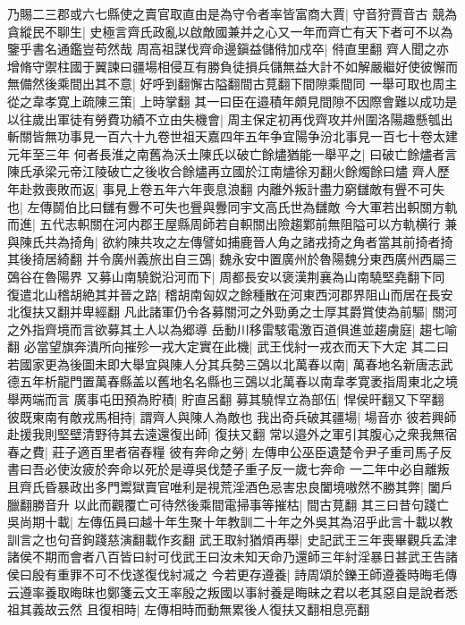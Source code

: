 乃賜二三郡或六七縣使之賣官取直由是為守令者率皆富商大賈|{
	守音狩賈音古}
競為貪縱民不聊生|{
	史極言齊氏政亂以啟敵國兼并之心又一年而齊亡有天下者可不以為鑒乎書名通鑑豈苟然哉}
周高祖謀伐齊命邊鎭益儲偫加戍卒|{
	偫直里翻}
齊人聞之亦增脩守禦柱國于翼諫曰疆場相侵互有勝負徒損兵儲無益大計不如解嚴繼好使彼懈而無備然後乘間出其不意|{
	好呼到翻懈古隘翻間古莧翻下間隙乘間同}
一舉可取也周主從之韋孝寛上疏陳三策|{
	上時掌翻}
其一曰臣在邉積年頗見間隙不因際會難以成功是以往歲出軍徒有勞費功績不立由失機會|{
	周主保定初再伐齊攻并州圍洛陽趣懸瓠出斬關皆無功事見一百六十九卷世祖天嘉四年五年争宜陽争汾北事見一百七十卷太建元年至三年}
何者長淮之南舊為沃土陳氏以破亡餘燼猶能一舉平之|{
	曰破亡餘燼者言陳氏承梁元帝江陵破亡之後收合餘燼再立國於江南燼徐刃翻火餘燭餘曰燼}
齊人歷年赴救喪敗而返|{
	事見上卷五年六年喪息浪翻}
内離外叛計盡力窮讎敵有舋不可失也|{
	左傳鬬伯比曰讎有釁不可失也舋與釁同宇文高氏世為讎敵}
今大軍若出軹關方軌而進|{
	五代志軹關在河内郡王屋縣周師若自軹關出險趨鄴前無阻隘可以方軌横行}
兼與陳氏共為掎角|{
	欲約陳共攻之左傳譬如捕鹿晉人角之諸戎掎之角者當其前掎者掎其後掎居綺翻}
并令廣州義旅出自三鵶|{
	魏永安中置廣州於魯陽魏分東西廣州西屬三鵶谷在魯陽界}
又募山南驍鋭沿河而下|{
	周都長安以褒漢荆襄為山南驍堅堯翻下同}
復遣北山稽胡絶其并晉之路|{
	稽胡南匈奴之餘種散在河東西河郡界阻山而居在長安北復扶又翻并卑經翻}
凡此諸軍仍令各募關河之外勁勇之士厚其爵賞使為前驅|{
	關河之外指齊境而言欲募其土人以為郷導}
岳動川移雷駭電激百道俱進並趨虜庭|{
	趨七喻翻}
必當望旗奔潰所向摧殄一戎大定實在此機|{
	武王伐紂一戎衣而天下大定}
其二曰若國家更為後圖未即大舉宜與陳人分其兵勢三鵶以北萬春以南|{
	萬春地名新唐志武德五年析龍門置萬春縣盖以舊地名名縣也三鵶以北萬春以南韋孝寛袤指周東北之境舉两端而言}
廣事屯田預為貯積|{
	貯直呂翻}
募其驍悍立為部伍|{
	悍侯旰翻又下罕翻}
彼既東南有敵戎馬相持|{
	謂齊人與陳人為敵也}
我出奇兵破其疆場|{
	場音亦}
彼若興師赴援我則堅壁清野待其去遠還復出師|{
	復扶又翻}
常以邉外之軍引其腹心之衆我無宿春之費|{
	莊子適百里者宿舂糧}
彼有奔命之勞|{
	左傳申公巫臣遺楚令尹子重司馬子反書曰吾必使汝疲於奔命以死於是導吳伐楚子重子反一歲七奔命}
一二年中必自離叛且齊氏昏暴政出多門鬻獄賣官唯利是視荒淫酒色忌害忠良闔境嗷然不勝其弊|{
	闔戶臘翻勝音升}
以此而觀覆亡可待然後乘間電掃事等摧枯|{
	間古莧翻}
其三曰昔句踐亡吳尚期十載|{
	左傳伍員曰越十年生聚十年教訓二十年之外吳其為沼乎此言十載以教訓言之也句音鉤踐慈演翻載作亥翻}
武王取紂猶煩再舉|{
	史記武王三年喪畢觀兵孟津諸侯不期而會者八百皆曰紂可伐武王曰汝未知天命乃還師三年紂淫暴日甚武王告諸侯曰殷有重罪不可不伐遂復伐紂㓕之}
今若更存遵養|{
	詩周頌於鑠王師遵養時晦毛傳云遵率養取晦昩也鄭箋云文王率殷之叛國以事紂養是晦昧之君以老其惡自是說者悉祖其義故云然}
且復相時|{
	左傳相時而動無累後人復扶又翻相息亮翻}
